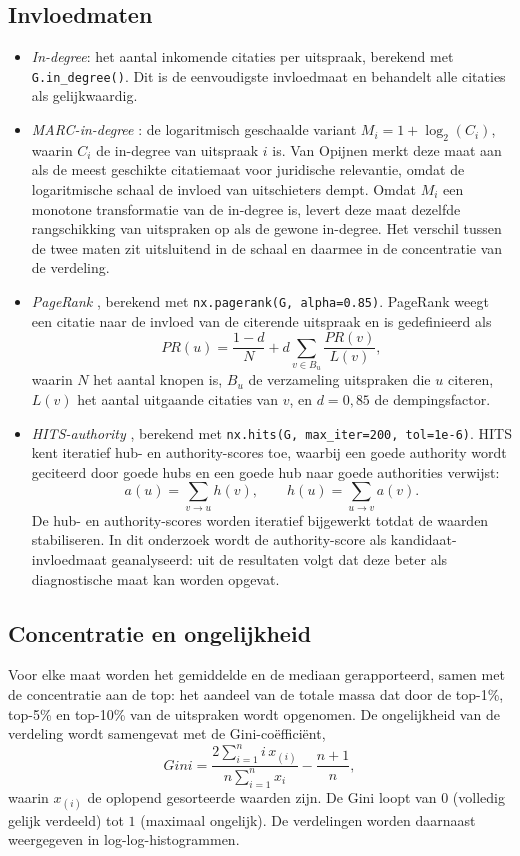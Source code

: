 \documentclass[a4paper, 12pt]{report}
\begin{document}
\subsection{Invloedmaten}

\begin{itemize}
  \item \emph{In-degree}: het aantal inkomende citaties per uitspraak, berekend met \texttt{G.in\_degree()}. Dit is de eenvoudigste invloedmaat en behandelt alle citaties als gelijkwaardig.
  \item \emph{MARC-in-degree} \parencite{vanopijnen2012}: de logaritmisch geschaalde variant $M_i = 1 + \log_2(C_i)$, waarin $C_i$ de in-degree van uitspraak $i$ is. Van Opijnen merkt deze maat aan als de meest geschikte citatiemaat voor juridische relevantie, omdat de logaritmische schaal de invloed van uitschieters dempt. Omdat $M_i$ een monotone transformatie van de in-degree is, levert deze maat dezelfde rangschikking van uitspraken op als de gewone in-degree. Het verschil tussen de twee maten zit uitsluitend in de schaal en daarmee in de concentratie van de verdeling.
  \item \emph{PageRank} \parencite{brin1998}, berekend met \texttt{nx.pagerank(G, alpha=0.85)}. PageRank weegt een citatie naar de invloed van de citerende uitspraak en is gedefinieerd als
  \[
    PR(u) = \frac{1-d}{N} + d \sum_{v \in B_u} \frac{PR(v)}{L(v)},
  \]
  waarin $N$ het aantal knopen is, $B_u$ de verzameling uitspraken die $u$ citeren, $L(v)$ het aantal uitgaande citaties van $v$, en $d = 0{,}85$ de dempingsfactor.
  \item \emph{HITS-authority} \parencite{kleinberg1999}, berekend met \texttt{nx.hits(G, max\_iter=200, tol=1e-6)}. HITS kent iteratief hub- en authority-scores toe, waarbij een goede authority wordt geciteerd door goede hubs en een goede hub naar goede authorities verwijst:
  \[
    a(u) = \sum_{v \rightarrow u} h(v), \qquad h(u) = \sum_{u \rightarrow v} a(v).
  \]
  De hub- en authority-scores worden iteratief bijgewerkt totdat de waarden stabiliseren. In dit onderzoek wordt de authority-score als kandidaat-invloedmaat geanalyseerd: uit de resultaten volgt dat deze beter als diagnostische maat kan worden opgevat.
\end{itemize}


\subsection{Concentratie en ongelijkheid} Voor elke maat worden het gemiddelde en de mediaan gerapporteerd, samen met de concentratie aan de top: het aandeel van de totale massa dat door de top-1\%, top-5\% en top-10\% van de uitspraken wordt opgenomen. De ongelijkheid van de verdeling wordt samengevat met de Gini-coëfficiënt,
\[
  \mathit{Gini} = \frac{2 \sum_{i=1}^{n} i\, x_{(i)}}{n \sum_{i=1}^{n} x_i} - \frac{n+1}{n},
\]
waarin $x_{(i)}$ de oplopend gesorteerde waarden zijn. De Gini loopt van $0$ (volledig gelijk verdeeld) tot $1$ (maximaal ongelijk). De verdelingen worden daarnaast weergegeven in log-log-histogrammen.
\end{document}
